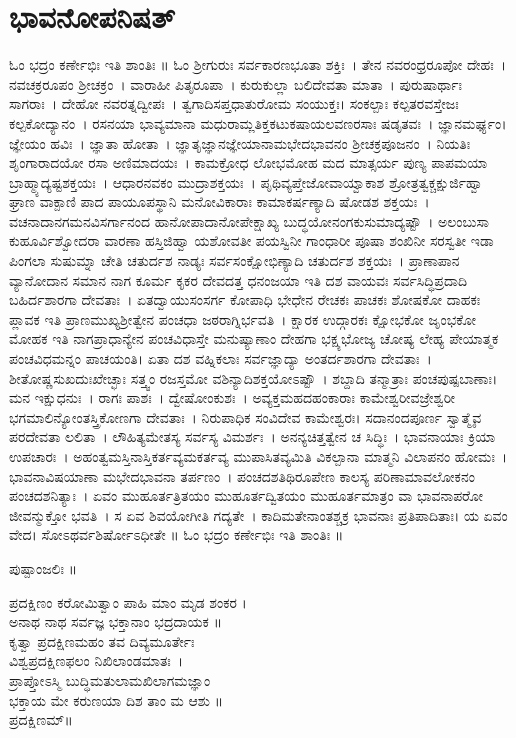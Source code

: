 \section{ಭಾವನೋಪನಿಷತ್}
ಓಂ ಭದ್ರಂ ಕರ್ಣೇಭಿಃ ಇತಿ ಶಾಂತಿಃ ॥
ಓಂ ಶ್ರೀಗುರುಃ ಸರ್ವಕಾರಣಭೂತಾ ಶಕ್ತಿಃ~। ತೇನ ನವರಂಧ್ರರೂಪೋ ದೇಹಃ~। ನವಚಕ್ರರೂಪಂ ಶ್ರೀಚಕ್ರಂ~। ವಾರಾಹೀ ಪಿತೃರೂಪಾ~। ಕುರುಕುಲ್ಲಾ ಬಲಿದೇವತಾ ಮಾತಾ~। ಪುರುಷಾರ್ಥಾಃ ಸಾಗರಾಃ~। ದೇಹೋ ನವರತ್ನದ್ವೀಪಃ~। ತ್ವಗಾದಿಸಪ್ತಧಾತುರೋಮ ಸಂಯುಕ್ತಃ। ಸಂಕಲ್ಪಾಃ ಕಲ್ಪತರವಸ್ತೇಜಃ ಕಲ್ಪಕೋ\-ದ್ಯಾನಂ~। ರಸನಯಾ ಭಾವ್ಯಮಾನಾ ಮಧುರಾಮ್ಲತಿಕ್ತಕಟುಕಷಾಯಲವಣರಸಾಃ ಷಡೃತವಃ~। ಜ್ಞಾನಮರ್ಘ್ಯಂ। ಜ್ಞೇಯಂ ಹವಿಃ~। ಜ್ಞಾತಾ ಹೋತಾ~। ಜ್ಞಾತೃಜ್ಞಾನಜ್ಞೇಯಾನಾಮಭೇದಭಾವನಂ ಶ್ರೀಚಕ್ರಪೂಜನಂ~। ನಿಯತಿಃ ಶೃಂಗಾರಾದಯೋ ರಸಾ ಅಣಿಮಾದಯಃ~। ಕಾಮಕ್ರೋಧ ಲೋಭಮೋಹ ಮದ ಮಾತ್ಸರ್ಯ ಪುಣ್ಯ ಪಾಪಮಯಾ ಬ್ರಾಹ್ಮ್ಯಾದ್ಯಷ್ಟಶಕ್ತಯಃ~। ಆಧಾರನವಕಂ ಮುದ್ರಾಶಕ್ತಯಃ~। ಪೃಥಿವ್ಯಪ್ತೇಜೋವಾಯ್ವಾಕಾಶ ಶ್ರೋತ್ರತ್ವಕ್ಚಕ್ಷುರ್ಜಿಹ್ವಾ ಘ್ರಾಣ ವಾಕ್ಪಾಣಿ ಪಾದ ಪಾಯೂಪಸ್ಥಾನಿ ಮನೋವಿಕಾರಾಃ ಕಾಮಾಕರ್ಷಣ್ಯಾದಿ ಷೋಡಶ ಶಕ್ತಯಃ~। ವಚನಾದಾನಗಮನವಿಸರ್ಗಾನಂದ ಹಾನೋಪಾದಾನೋಪೇಕ್ಷಾಖ್ಯ ಬುದ್ಧಯೋನಂಗಕುಸುಮಾದ್ಯಷ್ಟೌ~। ಅಲಂಬುಸಾ ಕುಹೂರ್ವಿಶ್ವೋದರಾ ವಾರಣಾ ಹಸ್ತಿಜಿಹ್ವಾ ಯಶೋವತೀ ಪಯಸ್ವಿನೀ ಗಾಂಧಾರೀ ಪೂಷಾ ಶಂಖಿನೀ ಸರಸ್ವತೀ ಇಡಾ ಪಿಂಗಲಾ ಸುಷುಮ್ನಾ ಚೇತಿ ಚತುರ್ದಶ ನಾಡ್ಯಃ ಸರ್ವಸಂಕ್ಷೋಭಿಣ್ಯಾದಿ ಚತುರ್ದಶ ಶಕ್ತಯಃ~। ಪ್ರಾಣಾಪಾನ ವ್ಯಾನೋದಾನ ಸಮಾನ ನಾಗ ಕೂರ್ಮ ಕೃಕರ ದೇವದತ್ತ ಧನಂಜಯಾ ಇತಿ ದಶ ವಾಯವಃ ಸರ್ವಸಿದ್ಧಿಪ್ರದಾದಿ ಬಹಿರ್ದಶಾರಗಾ ದೇವತಾಃ~। ಏತದ್ವಾಯುಸಂಸರ್ಗ ಕೋಪಾಧಿ ಭೇಧೇನ ರೇಚಕಃ ಪಾಚಕಃ ಶೋಷಕೋ ದಾಹಕಃ ಪ್ಲಾವಕ ಇತಿ ಪ್ರಾಣಮುಖ್ಯಶ್ರೀತ್ವೇನ ಪಂಚಧಾ ಜಠರಾಗ್ನಿರ್ಭವತಿ~। ಕ್ಷಾರಕ ಉದ್ಗಾರಕಃ ಕ್ಷೋಭಕೋ ಜೃಂಭಕೋ ಮೋಹಕ ಇತಿ ನಾಗಪ್ರಾಧಾನ್ಯೇನ ಪಂಚವಿಧಾಸ್ತೇ ಮನುಷ್ಯಾಣಾಂ ದೇಹಗಾ ಭಕ್ಷ್ಯಭೋಜ್ಯ ಚೋಷ್ಯ ಲೇಹ್ಯ ಪೇಯಾತ್ಮಕ ಪಂಚವಿಧಮನ್ನಂ ಪಾಚಯಂತಿ। ಏತಾ ದಶ ವಹ್ನಿಕಲಾಃ ಸರ್ವಜ್ಞಾದ್ಯಾ ಅಂತರ್ದಶಾರಗಾ ದೇವತಾಃ~। ಶೀತೋಷ್ಣಸುಖದುಃಖೇಚ್ಛಾಃ ಸತ್ತ್ವಂ ರಜಸ್ತಮೋ ವಶಿನ್ಯಾದಿಶಕ್ತಯೋಽಷ್ಟೌ~। ಶಬ್ದಾದಿ ತನ್ಮಾತ್ರಾಃ ಪಂಚಪುಷ್ಪಬಾಣಾಃ। ಮನ ಇಕ್ಷುಧನುಃ~। ರಾಗಃ ಪಾಶಃ~। ದ್ವೇಷೋಂಕುಶಃ~। ಅವ್ಯಕ್ತಮಹದಹಂಕಾರಾಃ ಕಾಮೇಶ್ವರೀವಜ್ರೇಶ್ವರೀ ಭಗಮಾಲಿನ್ಯೋಂತಸ್ತ್ರಿಕೋಣಗಾ ದೇವತಾಃ~। ನಿರುಪಾಧಿಕ ಸಂವಿದೇವ ಕಾಮೇಶ್ವರಃ। ಸದಾನಂದಪೂರ್ಣ ಸ್ವಾತ್ಮೈವ ಪರದೇವತಾ ಲಲಿತಾ~। ಲೌಹಿತ್ಯಮೇತಸ್ಯ ಸರ್ವಸ್ಯ ವಿಮರ್ಶಃ~। ಅನನ್ಯಚಿತ್ತತ್ವೇನ ಚ ಸಿದ್ಧಿಃ~। ಭಾವನಾಯಾಃ ಕ್ರಿಯಾ ಉಪಚಾರಃ~। ಅಹಂತ್ವಮಸ್ತಿನಾಸ್ತಿಕರ್ತವ್ಯಮಕರ್ತವ್ಯ ಮುಪಾಸಿತವ್ಯಮಿತಿ ವಿಕಲ್ಪಾನಾ ಮಾತ್ಮನಿ ವಿಲಾಪನಂ ಹೋಮಃ~। ಭಾವನಾವಿಷಯಾಣಾ ಮಭೇದಭಾವನಾ ತರ್ಪಣಂ~। ಪಂಚದಶತಿಥಿರೂಪೇಣ ಕಾಲಸ್ಯ ಪರಿಣಾಮಾವಲೋಕನಂ ಪಂಚದಶನಿತ್ಯಾಃ~। ಏವಂ ಮುಹೂರ್ತತ್ರಿತಯಂ ಮುಹೂರ್ತದ್ವಿತಯಂ ಮುಹೂರ್ತಮಾತ್ರಂ ವಾ ಭಾವನಾಪರೋ ಜೀವನ್ಮುಕ್ತೋ ಭವತಿ~। ಸ ಏವ ಶಿವಯೋಗೀತಿ ಗದ್ಯತೇ~। ಕಾದಿಮತೇನಾಂತಶ್ಚಕ್ರ ಭಾವನಾಃ ಪ್ರತಿಪಾದಿತಾಃ। ಯ ಏವಂ ವೇದ। ಸೋಽಥರ್ವಶಿರ್ಷೋಽಧೀತೇ ॥ ಓಂ ಭದ್ರಂ ಕರ್ಣೇಭಿಃ ಇತಿ ಶಾಂತಿಃ ॥

ಪುಷ್ಪಾಂಜಲಿಃ ॥

ಪ್ರದಕ್ಷಿಣಂ ಕರೋಮಿತ್ವಾಂ ಪಾಹಿ ಮಾಂ ಮೃಡ ಶಂಕರ ।\\
ಅನಾಥ ನಾಥ ಸರ್ವಜ್ಞ ಭಕ್ತಾನಾಂ ಭದ್ರದಾಯಕ ॥\\
ಕೃತ್ವಾ ಪ್ರದಕ್ಷಿಣಮಹಂ ತವ ದಿವ್ಯಮೂರ್ತೇಃ\\ವಿಶ್ವಪ್ರದಕ್ಷಿಣಫಲಂ ನಿಖಿಲಾಂಡಮಾತಃ~।\\
ಪ್ರಾಪ್ತೋಽಸ್ಮಿ ಬುದ್ಧಿಮತುಲಾಮಖಿಲಾಗಮಜ್ಞಾಂ \\ಭಕ್ತಾಯ ಮೇ ಕರುಣಯಾ ದಿಶ ತಾಂ ಮ ಆಶು ॥\\
ಪ್ರದಕ್ಷಿಣಮ್॥

